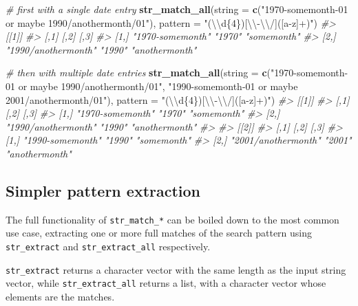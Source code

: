 \documentclass[]{book}
\newenvironment{Shaded}{}{}
\newcommand{\CharTok}[1]{\textcolor[rgb]{0.25,0.44,0.63}{#1}}
\newcommand{\CommentTok}[1]{\textcolor[rgb]{0.38,0.63,0.69}{\textit{#1}}}
\newcommand{\DataTypeTok}[1]{\textcolor[rgb]{0.56,0.13,0.00}{#1}}
\newcommand{\KeywordTok}[1]{\textcolor[rgb]{0.00,0.44,0.13}{\textbf{#1}}}
\newcommand{\NormalTok}[1]{#1}
\newcommand{\StringTok}[1]{\textcolor[rgb]{0.25,0.44,0.63}{#1}}
\begin{document}
\begin{Shaded}
\begin{Highlighting}[]
\CommentTok{# first with a single date entry}
\KeywordTok{str_match_all}\NormalTok{(}\DataTypeTok{string =} \KeywordTok{c}\NormalTok{(}\StringTok{"1970-somemonth-01 or maybe 1990/anothermonth/01"}\NormalTok{),}
              \DataTypeTok{pattern =} \StringTok{"(}\CharTok{\textbackslash{}\textbackslash{}}\StringTok{d\{4\})[}\CharTok{\textbackslash{}\textbackslash{}}\StringTok{-}\CharTok{\textbackslash{}\textbackslash{}}\StringTok{/]([a-z]+)"}\NormalTok{)}
\CommentTok{#> [[1]]}
\CommentTok{#>      [,1]                [,2]   [,3]          }
\CommentTok{#> [1,] "1970-somemonth"    "1970" "somemonth"   }
\CommentTok{#> [2,] "1990/anothermonth" "1990" "anothermonth"}

\CommentTok{# then with multiple date entries}
\KeywordTok{str_match_all}\NormalTok{(}\DataTypeTok{string =} \KeywordTok{c}\NormalTok{(}\StringTok{"1970-somemonth-01 or maybe 1990/anothermonth/01"}\NormalTok{,}
                         \StringTok{"1990-somemonth-01 or maybe 2001/anothermonth/01"}\NormalTok{),}
              \DataTypeTok{pattern =} \StringTok{"(}\CharTok{\textbackslash{}\textbackslash{}}\StringTok{d\{4\})[}\CharTok{\textbackslash{}\textbackslash{}}\StringTok{-}\CharTok{\textbackslash{}\textbackslash{}}\StringTok{/]([a-z]+)"}\NormalTok{)}
\CommentTok{#> [[1]]}
\CommentTok{#>      [,1]                [,2]   [,3]          }
\CommentTok{#> [1,] "1970-somemonth"    "1970" "somemonth"   }
\CommentTok{#> [2,] "1990/anothermonth" "1990" "anothermonth"}
\CommentTok{#> }
\CommentTok{#> [[2]]}
\CommentTok{#>      [,1]                [,2]   [,3]          }
\CommentTok{#> [1,] "1990-somemonth"    "1990" "somemonth"   }
\CommentTok{#> [2,] "2001/anothermonth" "2001" "anothermonth"}
\end{Highlighting}
\end{Shaded}

\hypertarget{simpler-pattern-extraction}{%
\subsection{Simpler pattern extraction}\label{simpler-pattern-extraction}}

The full functionality of \texttt{str\_match\_*} can be boiled down to the most common use case, extracting one or more full matches of the search pattern using \texttt{str\_extract} and \texttt{str\_extract\_all} respectively.

\texttt{str\_extract} returns a character vector with the same length as the input string vector, while \texttt{str\_extract\_all} returns a list, with a character vector whose elements are the matches.
\end{document}
